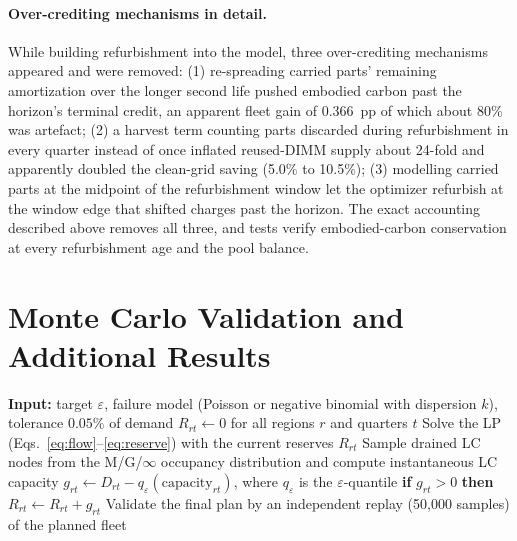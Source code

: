 \documentclass{article} %
\begin{document}
\paragraph{Over-crediting mechanisms in detail.} While building refurbishment into the model, three over-crediting mechanisms appeared and were removed: (1) re-spreading carried parts' remaining amortization over the longer second life pushed embodied carbon past the horizon's terminal credit, an apparent fleet gain of 0.366~pp of which about 80\% was artefact; (2) a harvest term counting parts discarded during refurbishment in every quarter instead of once inflated reused-DIMM supply about 24-fold and apparently doubled the clean-grid saving (5.0\% to 10.5\%); (3) modelling carried parts at the midpoint of the refurbishment window let the optimizer refurbish at the window edge that shifted charges past the horizon. The exact accounting described above removes all three, and tests verify embodied-carbon conservation at every refurbishment age and the pool balance.

\section{Monte Carlo Validation and Additional Results}
\label{app:results}

\begin{algorithm}[h]
\caption{Chance-constrained LC headroom with Monte Carlo in the loop}
\label{alg:cc}
\begin{algorithmic}[1]
\STATE \textbf{Input:} target $\varepsilon$, failure model (Poisson or negative binomial with dispersion $k$), tolerance $0.05\%$ of demand
\STATE $R_{rt} \leftarrow 0$ for all regions $r$ and quarters $t$
\REPEAT
\STATE Solve the LP (Eqs.~\ref{eq:flow}--\ref{eq:reserve}) with the current reserves $R_{rt}$
\STATE Sample drained LC nodes from the M/G/$\infty$ occupancy distribution and compute instantaneous LC capacity
\STATE $g_{rt} \leftarrow D_{rt} - q_{\varepsilon}(\text{capacity}_{rt})$, where $q_\varepsilon$ is the $\varepsilon$-quantile
\STATE \textbf{if} $g_{rt} > 0$ \textbf{then} $R_{rt} \leftarrow R_{rt} + g_{rt}$
\ENDFOR
{}
\STATE Validate the final plan by an independent replay (50,000 samples) of the planned fleet
\end{algorithmic}
\end{algorithm}
\end{document}

